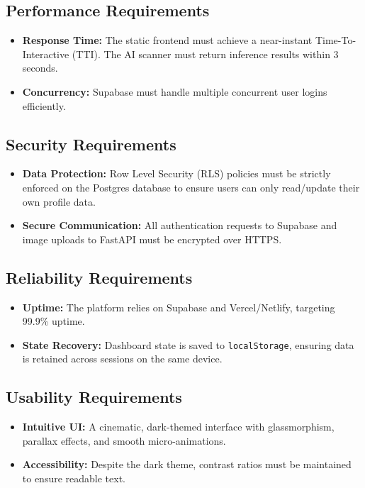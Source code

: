 \documentclass[12pt,a4paper]{article}
\begin{document}
\subsection{Performance Requirements}
\begin{itemize}
    \item \textbf{Response Time:} The static frontend must achieve a near-instant Time-To-Interactive (TTI). The AI scanner must return inference results within 3 seconds.
    \item \textbf{Concurrency:} Supabase must handle multiple concurrent user logins efficiently.
\end{itemize}

\subsection{Security Requirements}
\begin{itemize}
    \item \textbf{Data Protection:} Row Level Security (RLS) policies must be strictly enforced on the Postgres database to ensure users can only read/update their own profile data.
    \item \textbf{Secure Communication:} All authentication requests to Supabase and image uploads to FastAPI must be encrypted over HTTPS.
\end{itemize}

\subsection{Reliability Requirements}
\begin{itemize}
    \item \textbf{Uptime:} The platform relies on Supabase and Vercel/Netlify, targeting 99.9\% uptime.
    \item \textbf{State Recovery:} Dashboard state is saved to \texttt{localStorage}, ensuring data is retained across sessions on the same device.
\end{itemize}

\subsection{Usability Requirements}
\begin{itemize}
    \item \textbf{Intuitive UI:} A cinematic, dark-themed interface with glassmorphism, parallax effects, and smooth micro-animations.
    \item \textbf{Accessibility:} Despite the dark theme, contrast ratios must be maintained to ensure readable text.
\end{itemize}
\end{document}
